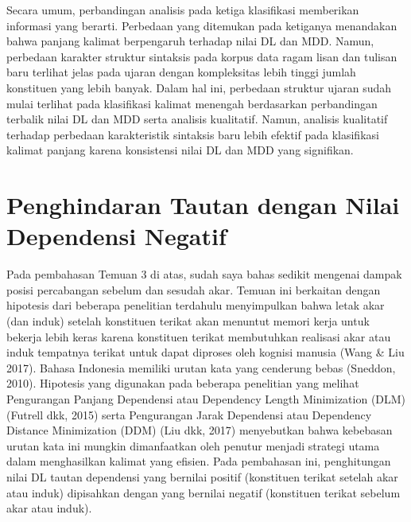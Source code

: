 Secara umum, perbandingan analisis pada ketiga klasifikasi memberikan informasi yang berarti. Perbedaan yang ditemukan pada ketiganya menandakan bahwa panjang kalimat berpengaruh terhadap nilai DL dan MDD. Namun, perbedaan karakter struktur sintaksis pada korpus data ragam lisan dan tulisan baru terlihat jelas pada ujaran dengan kompleksitas lebih tinggi jumlah konstituen yang lebih banyak. Dalam hal ini, perbedaan struktur ujaran sudah mulai terlihat pada klasifikasi kalimat menengah berdasarkan perbandingan terbalik nilai DL dan MDD serta analisis kualitatif. Namun, analisis kualitatif terhadap perbedaan karakteristik sintaksis baru lebih efektif pada klasifikasi kalimat panjang karena konsistensi nilai DL dan MDD yang signifikan.

\section{Penghindaran Tautan dengan Nilai Dependensi Negatif}
Pada pembahasan Temuan 3 di atas, sudah saya bahas sedikit mengenai dampak posisi percabangan sebelum dan sesudah akar. Temuan ini berkaitan dengan hipotesis dari beberapa penelitian terdahulu menyimpulkan bahwa letak akar (dan induk) setelah konstituen terikat akan menuntut memori kerja untuk bekerja lebih keras karena konstituen terikat membutuhkan realisasi akar atau induk tempatnya terikat untuk dapat diproses oleh kognisi manusia (Wang & Liu 2017). Bahasa Indonesia memiliki urutan kata yang cenderung bebas (Sneddon, 2010). Hipotesis yang digunakan pada beberapa penelitian yang melihat Pengurangan Panjang Dependensi atau Dependency Length Minimization (DLM) (Futrell dkk, 2015) serta Pengurangan Jarak Dependensi atau Dependency Distance Minimization (DDM) (Liu dkk, 2017) menyebutkan bahwa kebebasan urutan kata ini mungkin dimanfaatkan oleh penutur menjadi strategi utama dalam menghasilkan kalimat yang efisien. Pada pembahasan ini, penghitungan nilai DL tautan dependensi yang bernilai positif (konstituen terikat setelah akar atau induk) dipisahkan dengan yang bernilai negatif (konstituen terikat sebelum akar atau induk). 

